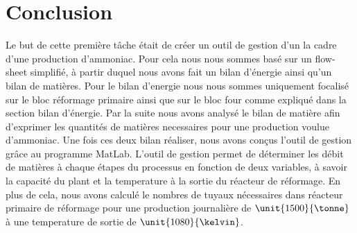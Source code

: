 \section{Conclusion}
Le but de cette première tâche était de créer un outil de gestion d'un la cadre d'une production d'ammoniac. 
Pour cela nous nous sommes basé sur un flow-sheet simplifié, à partir duquel nous avons fait un bilan d'énergie ainsi
qu'un bilan de matières. Pour le bilan d'energie nous nous sommes uniquement focalisé sur le bloc réformage primaire ainsi
que sur le bloc four comme expliqué dans la section bilan d'énergie. Par la suite nous avons analysé le bilan de matière 
afin d'exprimer les quantités de matières necessaires pour une production voulue d'ammoniac. Une fois ces deux bilan 
réaliser, nous avons conçus l'outil de gestion grâce au programme MatLab. L'outil de gestion permet de déterminer les débit 
de matières à chaque étapes du processus en fonction de deux variables, à savoir la capacité du plant et la temperature à 
la sortie du réacteur de réformage. En plus de cela, nous avons calculé le nombres de tuyaux nécessaires dans réacteur
primaire de réformage pour une production journalière de $\unit{1500}{\tonne}$ à une temperature de sortie de 
$\unit{1080}{\kelvin}$.
